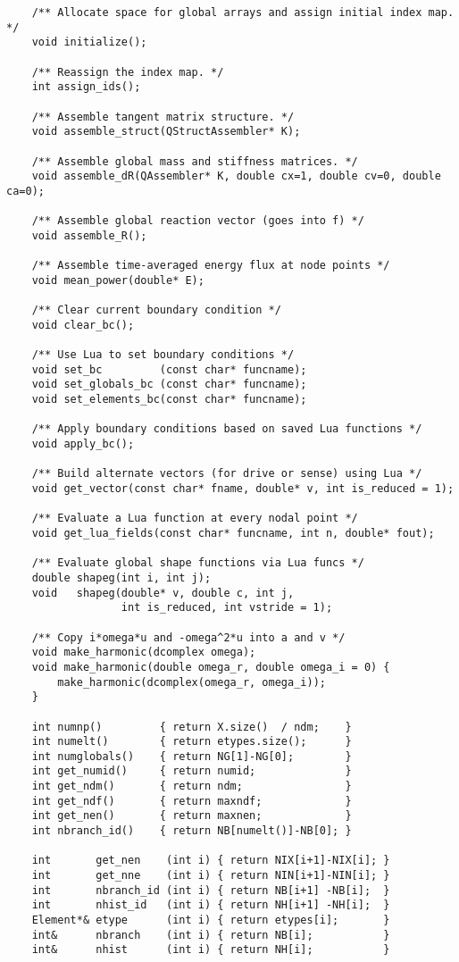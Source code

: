 \begin{verbatim}
    /** Allocate space for global arrays and assign initial index map. */
    void initialize();

    /** Reassign the index map. */
    int assign_ids();

    /** Assemble tangent matrix structure. */
    void assemble_struct(QStructAssembler* K);

    /** Assemble global mass and stiffness matrices. */
    void assemble_dR(QAssembler* K, double cx=1, double cv=0, double ca=0);

    /** Assemble global reaction vector (goes into f) */
    void assemble_R();

    /** Assemble time-averaged energy flux at node points */
    void mean_power(double* E);

    /** Clear current boundary condition */
    void clear_bc();

    /** Use Lua to set boundary conditions */
    void set_bc         (const char* funcname);
    void set_globals_bc (const char* funcname);
    void set_elements_bc(const char* funcname);

    /** Apply boundary conditions based on saved Lua functions */
    void apply_bc();

    /** Build alternate vectors (for drive or sense) using Lua */
    void get_vector(const char* fname, double* v, int is_reduced = 1);

    /** Evaluate a Lua function at every nodal point */
    void get_lua_fields(const char* funcname, int n, double* fout);

    /** Evaluate global shape functions via Lua funcs */
    double shapeg(int i, int j);
    void   shapeg(double* v, double c, int j,
                  int is_reduced, int vstride = 1);

    /** Copy i*omega*u and -omega^2*u into a and v */
    void make_harmonic(dcomplex omega);
    void make_harmonic(double omega_r, double omega_i = 0) {
        make_harmonic(dcomplex(omega_r, omega_i));
    }

    int numnp()         { return X.size()  / ndm;    }
    int numelt()        { return etypes.size();      }
    int numglobals()    { return NG[1]-NG[0];        }
    int get_numid()     { return numid;              }
    int get_ndm()       { return ndm;                }
    int get_ndf()       { return maxndf;             }
    int get_nen()       { return maxnen;             }
    int nbranch_id()    { return NB[numelt()]-NB[0]; }

    int       get_nen    (int i) { return NIX[i+1]-NIX[i]; }
    int       get_nne    (int i) { return NIN[i+1]-NIN[i]; }
    int       nbranch_id (int i) { return NB[i+1] -NB[i];  }
    int       nhist_id   (int i) { return NH[i+1] -NH[i];  }
    Element*& etype      (int i) { return etypes[i];       }
    int&      nbranch    (int i) { return NB[i];           }
    int&      nhist      (int i) { return NH[i];           }


\end{verbatim}
